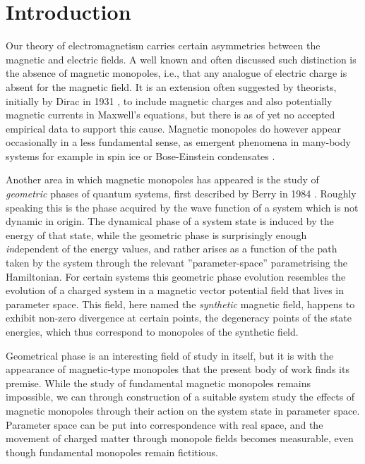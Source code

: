 \documentclass[main.tex]{subfiles}
\begin{document}
\section{Introduction}
\label{sec:introduction}
Our theory of electromagnetism carries certain asymmetries between the magnetic and
electric fields. A well known and often discussed such distinction is the absence of
magnetic monopoles, i.e., that
any analogue of electric charge is absent for the magnetic field. It is an extension often
suggested by theorists, initially by Dirac in 1931 \cite{dirac}, to include magnetic
charges and also potentially magnetic currents in Maxwell's equations, but
there is as of yet no accepted empirical data to support this cause. Magnetic monopoles do
however appear occasionally in a less fundamental sense, as emergent phenomena in
many-body systems for example in
spin ice \cite{castelnovo} or Bose-Einstein condensates \cite{ray}. 

Another area in which magnetic monopoles has appeared is the study of \textit{geometric}
phases of quantum systems, first described by Berry in 1984 \cite{berry1984}. Roughly
speaking this is the phase acquired by the wave function of a system which is not dynamic
in origin. The dynamical phase of a system state is induced by the energy of that state,
while the geometric phase is surprisingly enough \textit{in}dependent of the energy values,
and rather arises as a function of the path taken by the system through the relevant
''parameter-space'' parametrising the Hamiltonian. For certain systems this geometric phase evolution
resembles the %
evolution of a charged system in a magnetic vector potential field that lives in 
parameter space. This field, here named the \textit{synthetic} magnetic field, happens to
exhibit non-zero divergence at certain points, the degeneracy points of the state energies,
which thus correspond to monopoles of the synthetic field.

Geometrical phase is an interesting field of study in itself, but it is with the
appearance of magnetic-type monopoles that the present body of work finds its premise.
While the study of fundamental magnetic monopoles remains impossible, we can through construction of
a suitable system study the effects of magnetic monopoles through their action on the
system state in parameter space. Parameter space can be put into correspondence with real
space, and the movement of charged matter through monopole fields
becomes measurable, even though fundamental monopoles remain fictitious.
\end{document}
